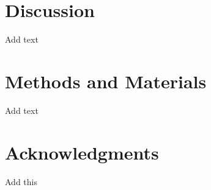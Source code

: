 \documentclass[9pt,lineno]{elife}
\begin{document}
\section{Discussion}

Add text

\section{Methods and Materials}

Add text




\section{Acknowledgments}

Add this

\nolinenumbers


\end{document}
